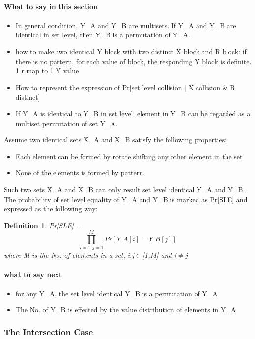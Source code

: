 \documentclass{article}
\newtheorem{defination}{Definition}[section]
\begin{document}
\paragraph{What to say in this section}
\begin{itemize}
	\item In general condition, Y\_A and Y\_B are multisets. If Y\_A and Y\_B are identical in set level, then Y\_B is a permutation of Y\_A.
	\item how to make two identical Y block with two distinct X block and R block: if there is no pattern, for each value of block, the responding Y block is definite. 1 r map to 1 Y value
	\item How to represent the expression of Pr[set level collision $\mid$ X collision \& R distinct]
	\item If Y\_A is identical to Y\_B in set level, element in Y\_B can be regarded as a multiset permutation of set Y\_A.
\end{itemize}

Assume two identical sets X\_A and X\_B satisfy the following properties:
\begin{itemize}
	\item Each element can be formed by rotate shifting any other element in the set
	\item None of the elements is formed by pattern.
\end{itemize}
Such two sets X\_A and X\_B can only result set level identical Y\_A and Y\_B.
The probability of set level equality of Y\_A and Y\_B is marked as Pr[SLE] and expressed as the following way:
\begin{defination}
Pr[SLE] = $$\prod_{i=1,j=1}^M Pr[Y\_A[i] = Y\_B[j]]$$ where M is the No. of elements in a set, i,j$\in$[1,M] and i$\neq$j
\end{defination} 

\paragraph{what to say next}
\begin{itemize}
	\item for any Y\_A, the set level identical Y\_B is a permutation of Y\_A
	\item The No. of Y\_B is effected by the value distribution of elements in Y\_A
\end{itemize}



\subsubsection{The Intersection Case}
\end{document}
